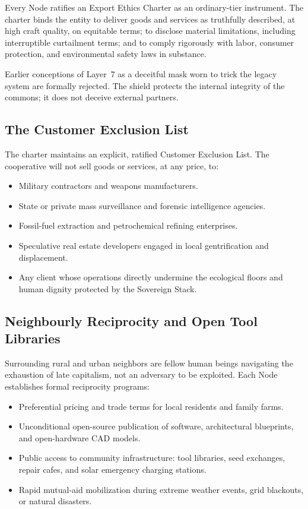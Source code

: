 Every Node ratifies an Export Ethics Charter as an ordinary-tier instrument. The charter binds the entity to deliver goods and services as truthfully described, at high craft quality, on equitable terms; to disclose material limitations, including interruptible curtailment terms; and to comply rigorously with labor, consumer protection, and environmental safety laws in substance. 

Earlier conceptions of Layer~7 as a deceitful mask worn to trick the legacy system are formally rejected. The shield protects the internal integrity of the commons; it does not deceive external partners.

\subsection{The Customer Exclusion List}

The charter maintains an explicit, ratified Customer Exclusion List. The cooperative will not sell goods or services, at any price, to:
\begin{itemize}
  \item Military contractors and weapons manufacturers.
  \item State or private mass surveillance and forensic intelligence agencies.
  \item Fossil-fuel extraction and petrochemical refining enterprises.
  \item Speculative real estate developers engaged in local gentrification and displacement.
  \item Any client whose operations directly undermine the ecological floors and human dignity protected by the Sovereign Stack.
\end{itemize}

\subsection{Neighbourly Reciprocity and Open Tool Libraries}

Surrounding rural and urban neighbors are fellow human beings navigating the exhaustion of late capitalism, not an adversary to be exploited. Each Node establishes formal reciprocity programs:
\begin{itemize}
  \item Preferential pricing and trade terms for local residents and family farms.
  \item Unconditional open-source publication of software, architectural blueprints, and open-hardware CAD models.
  \item Public access to community infrastructure: tool libraries, seed exchanges, repair cafes, and solar emergency charging stations.
  \item Rapid mutual-aid mobilization during extreme weather events, grid blackouts, or natural disasters.
\end{itemize}

